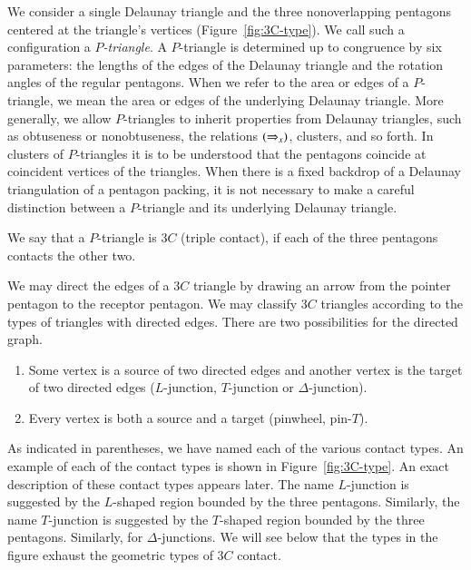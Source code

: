 We consider a single Delaunay triangle and the three nonoverlapping
pentagons centered at the triangle's vertices
(Figure~\ref{fig:3C-type}).  We call such a configuration a {\it
  $P$-triangle}.  A $P$-triangle is determined up to congruence by six
parameters: the lengths of the edges of the Delaunay triangle and the
rotation angles of the regular pentagons.  When we refer to the area
or edges of a $P$-triangle, we mean the area or edges of the
underlying Delaunay triangle.  More generally, we allow $P$-triangles
to inherit properties from Delaunay triangles, such as obtuseness or
nonobtuseness, the relations $(\Rightarrow_{x})$, clusters, and so forth. In
clusters of $P$-triangles it is to be understood that the pentagons
coincide at coincident vertices of the triangles.  When there is a
fixed backdrop of a Delaunay triangulation of a pentagon packing, it
is not necessary to make a careful distinction between a
$P$-triangle and its underlying Delaunay triangle.

We say that a $P$-triangle is $3C$ (triple contact),
if each of the three pentagons contacts the other two.

We may direct the edges of a $3C$ triangle by drawing an arrow from
the pointer pentagon to the receptor pentagon.  We may classify $3C$
triangles according to the types of triangles with directed edges.
There are two possibilities for the directed graph.
\begin{enumerate}
\item Some vertex is a source of two directed edges and another vertex
is the target of two directed edges  ($L$-junction, $T$-junction or
  $\Delta$-junction).
\item Every vertex is both a source and a target (pinwheel, pin-$T$).
\end{enumerate}

As indicated in parentheses, we have named each of the various contact
types.  An example of each of the contact types is shown in
Figure~\ref{fig:3C-type}.  An exact description of these contact types
appears later.  The name $L$-junction is suggested by the $L$-shaped
region bounded by the three pentagons.  Similarly, the name
$T$-junction is suggested by the $T$-shaped region bounded by the
three pentagons.  Similarly, for $\Delta$-junctions.  We will see
below that the types in the figure exhaust the geometric types of
$3C$ contact.


